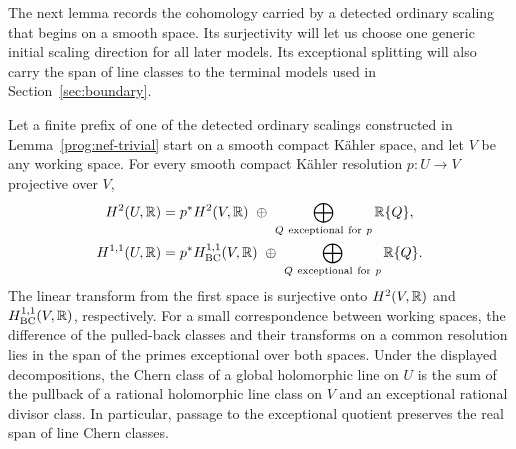 The next lemma records the cohomology carried by a detected ordinary scaling
that begins on a smooth space. Its surjectivity will let us choose one
generic initial scaling direction for all later models. Its exceptional
splitting will also carry the span of line classes to the terminal models
used in Section~\ref{sec:boundary}.

\begin{lemma}
\label{prog:cohomology-transport}
Let a finite prefix of one of the detected ordinary scalings constructed
in Lemma~\ref{prog:nef-trivial} start on a smooth compact Kähler
space, and let \(V\) be any working space.
For every smooth compact Kähler resolution \(p:U\to V\)
projective over \(V\),
\begin{align}
 H^2(U,\mathbb R)
 &=p^*H^2(V,\mathbb R)\ \oplus\
   \bigoplus_{Q\ {\rm exceptional\ for}\ p}\mathbb R\{Q\}, \label{prog:H2}\\
 H^{1,1}(U,\mathbb R)
 &=p^*H^{1,1}_{\mathrm{BC}}(V,\mathbb R)\ \oplus\
   \bigoplus_{Q\ {\rm exceptional\ for}\ p}\mathbb R\{Q\}.
 \label{prog:H11}
\end{align}
The linear transform from the first space is surjective onto
\(H^2(V,\mathbb R)\) and \(H^{1,1}_{\mathrm{BC}}(V,\mathbb R)\), respectively. For a small correspondence between
working spaces, the difference of the pulled-back classes and
their transforms on a common resolution lies in the span of the
primes exceptional over both spaces.
Under the displayed decompositions, the Chern class of a global
holomorphic line on \(U\) is the sum of the pullback of a rational
holomorphic line class on \(V\) and an exceptional rational divisor
class.  In particular, passage to the exceptional quotient preserves
the real span of line Chern classes.
\end{lemma}

